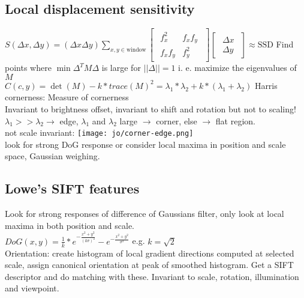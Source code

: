 \subsection*{Local displacement sensitivity }
$S (\Delta x, \Delta y) = (\Delta x \Delta y) \sum_{x, y \in \text{window}}
\begin{bmatrix}
    \begin{smallmatrix} 
        f_x^{2} & f_x f_y \\ 
        f_x f_y & f_y^{2} 
    \end{smallmatrix} 
\end{bmatrix}
\begin{bmatrix}
    \begin{smallmatrix} 
        \Delta x \\ 
        \Delta y
    \end{smallmatrix} 
\end{bmatrix} 
\approx \text{SSD}$
Find points where $\min \Delta^T M \Delta$ is large for $||\Delta || = 1$ i. e. maximize the eigenvalues of $M$\\
$C(c, y) = \det(M) - k * trace(M)^{2} = \lambda_1 * \lambda_2 + k * (\lambda_1 + \lambda_2)$ Harris cornerness: Measure of cornerness\\
 Invariant to brightness offset, invariant to shift and rotation but not to scaling!
$\lambda_1 >> \lambda_2 \rightarrow$ edge, $\lambda_1$ and $ \lambda_2$ large $\rightarrow$ corner, else $\rightarrow$ flat region.\\
not scale invariant: \texttt{[image: jo/corner-edge.png]}\\
 look for strong DoG response or consider local maxima in position and scale space, Gaussian weighing.
\subsection*{Lowe's SIFT features}
Look for strong responses of difference of Gaussians  filter, only look at local maxima in both position and scale.\\
 $DoG(x, y) = \frac{1}{k}* e^{-\frac{x^{2} + y^{2}}{(k\sigma)^{2}}} - e^{-\frac{x^{2} + y^{2}}{\sigma^{2}}}$ e.g. $k = \sqrt{2}$\\
Orientation: create histogram of local gradient directions computed at selected scale, assign canonical orientation at peak of smoothed histogram. Get a SIFT descriptor  and do matching with these. Invariant to scale, rotation, illumination and viewpoint.
